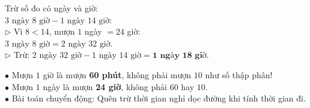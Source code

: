 \documentclass[14pt,a4paper,oneside]{extbook}
\begin{document}
\vspace{3mm}

\noindent
\begin{minipage}[t]{0.54\textwidth}
  \begin{tcolorbox}[
    enhanced,
    title={\footnotesize\bfseries\color{white}\faBolt\ Đổi đơn vị trước khi trừ},
    colback=green!3!white,
    colframe=green!60!black,
    arc=2.5mm, boxrule=0.8pt, top=1.8mm, bottom=1.8mm, left=2.2mm, right=2.2mm
  ]
    \footnotesize
    Trừ số đo có ngày và giờ:\\
    $3\text{ ngày } 8\text{ giờ} - 1\text{ ngày } 14\text{ giờ}$:\\
    $\triangleright$ Vì $8 < 14$, mượn $1$ ngày $= 24$ giờ:\\
    \quad $3\text{ ngày } 8\text{ giờ} = 2\text{ ngày } 32\text{ giờ}$.\\
    $\triangleright$ Trừ: $2\text{ ngày } 32\text{ giờ} - 1\text{ ngày } 14\text{ giờ} = \mathbf{1\text{ ngày } 18\text{ giờ}}$.
  \end{tcolorbox}
\end{minipage}%
\hfill
\begin{minipage}[t]{0.44\textwidth}
  \begin{tcolorbox}[
    enhanced,
    title={\footnotesize\bfseries\color{white}\faExclamationTriangle\ Mẹo tránh bẫy trắc nghiệm},
    colback=red!2!white,
    colframe=red!70!black,
    arc=2.5mm, boxrule=0.8pt, top=1.8mm, bottom=1.8mm, left=2.2mm, right=2.2mm
  ]
    \footnotesize
    $\bullet$ Mượn $1$ giờ là mượn \textbf{60 phút}, không phải mượn $10$ như số thập phân!\\
    $\bullet$ Mượn $1$ ngày là mượn \textbf{24 giờ}, không phải $60$ hay $10$.\\
    $\bullet$ Bài toán chuyển động: Quên trừ thời gian nghỉ dọc đường khi tính thời gian đi.
  \end{tcolorbox}
\end{minipage}
\end{document}
